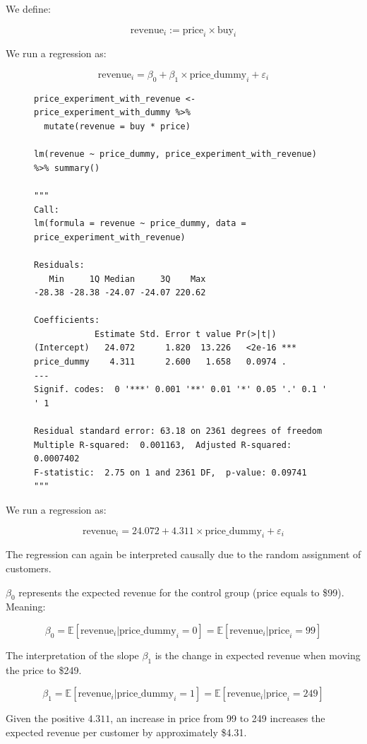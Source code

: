 \documentclass{article}
\begin{document}
We define:

$$
\text{revenue}_i := \text{price}_i \times \text{buy}_i
$$

We run a regression as:

$$
\text{revenue}_i = \beta_0 + \beta_1 \times \text{price\_dummy}_i + \varepsilon_i
$$

\begin{figure}[H]
\centering
\begin{lstlisting}[style=Rstyle, caption=Simple Regression on Price Experiment]
price_experiment_with_revenue <- price_experiment_with_dummy %>% 
  mutate(revenue = buy * price)

lm(revenue ~ price_dummy, price_experiment_with_revenue) %>% summary()

"""
Call:
lm(formula = revenue ~ price_dummy, data = price_experiment_with_revenue)

Residuals:
   Min     1Q Median     3Q    Max 
-28.38 -28.38 -24.07 -24.07 220.62 

Coefficients:
            Estimate Std. Error t value Pr(>|t|)    
(Intercept)   24.072      1.820  13.226   <2e-16 ***
price_dummy    4.311      2.600   1.658   0.0974 .  
---
Signif. codes:  0 '***' 0.001 '**' 0.01 '*' 0.05 '.' 0.1 ' ' 1

Residual standard error: 63.18 on 2361 degrees of freedom
Multiple R-squared:  0.001163,	Adjusted R-squared:  0.0007402 
F-statistic:  2.75 on 1 and 2361 DF,  p-value: 0.09741
"""
\end{lstlisting}
\end{figure}

We run a regression as:

$$
\text{revenue}_i = 24.072 + 4.311 \times \text{price\_dummy}_i + \varepsilon_i
$$

The regression can again be interpreted causally due to the random assignment of customers.

$\beta_0$ represents the expected revenue for the control group (price equals to \$99). Meaning:

$$
\beta_0 = \mathbb{E}[\text{revenue}_i | \text{price\_dummy}_i = 0] = \mathbb{E}[\text{revenue}_i | \text{price}_i = 99]
$$

The interpretation of the slope $\beta_1$ is the change in expected revenue when moving the price to \$249.

$$
\beta_1 = \mathbb{E}[\text{revenue}_i | \text{price\_dummy}_i = 1] = \mathbb{E}[\text{revenue}_i | \text{price}_i = 249]
$$

Given the positive $4.311$, an increase in price from 99 to 249 increases the expected revenue per customer by approximately \$4.31.
\end{document}
